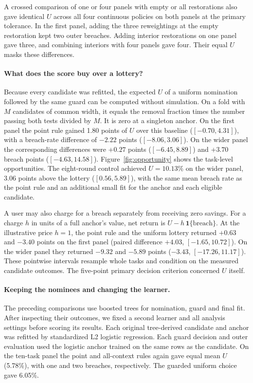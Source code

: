 A crossed comparison of one or four panels with empty or all restorations also gave identical $U$ across all four continuous policies on both panels at the primary tolerance. In the first panel, adding the three reweightings at the empty restoration kept two outer breaches. Adding interior restorations on one panel gave three, and combining interiors with four panels gave four. Their equal $U$ masks these differences.

\paragraph{What does the score buy over a lottery?}
Because every candidate was refitted, the expected $U$ of a uniform nomination followed by the same guard can be computed without simulation. On a fold with $M$ candidates of common width, it equals the removal fraction times the number passing both tests divided by $M$. It is zero at a singleton anchor. On the first panel the point rule gained 1.80 points of $U$ over this baseline ($[-0.70,4.31]$), with a breach-rate difference of $-2.22$ points ($[-8.06,3.06]$). On the wider panel the corresponding differences were $+0.27$ points ($[-6.45,8.89]$) and $+3.70$ breach points ($[-4.63,14.58]$). Figure~\ref{fig:opportunity} shows the task-level opportunities. The eight-round control achieved $U=10.13\%$ on the wider panel, 3.06 points above the lottery ($[0.56,5.89]$), with the same mean breach rate as the point rule and an additional small fit for the anchor and each eligible candidate.



A user may also charge for a breach separately from receiving zero savings. For a charge $h$ in units of a full anchor's value, net return is $U-h\,\mathbf 1\{\mathrm{breach}\}$. At the illustrative price $h=1$, the point rule and the uniform lottery returned $+0.63$ and $-3.40$ points on the first panel (paired difference $+4.03$, $[-1.65,10.72]$). On the wider panel they returned $-9.32$ and $-5.89$ points ($-3.43$, $[-17.26,11.17]$). These pointwise intervals resample whole tasks and condition on the measured candidate outcomes. The five-point primary decision criterion concerned $U$ itself.



\paragraph{Keeping the nominees and changing the learner.}
The preceding comparisons use boosted trees for nomination, guard and final fit. After inspecting their outcomes, we fixed a second learner and all analysis settings before scoring its results. Each original tree-derived candidate and anchor was refitted by standardized L2 logistic regression. Each guard decision and outer evaluation used the logistic anchor trained on the same rows as the candidate. On the ten-task panel the point and all-context rules again gave equal mean $U$ (5.78\%), with one and two breaches, respectively. The guarded uniform choice gave 6.05\%.

